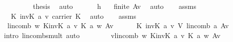 \begin{isabellebody}
\ \ \ \ \isamarkupfalse%
\ {}\ {}\ \isamarkupfalse%
\ {\isacharquery}thesis\ \isamarkupfalse%
\ auto\isanewline
\ \ \isamarkupfalse%
\isanewline
\ \ \isamarkupfalse%
\ h{}\ \isamarkupfalse%
\ {}{}{\isacharcolon}\ {\isachardoublequoteopen}finite\ {\isacharparenleft}A{\isacharminus}{\isacharbraceleft}v{\isacharbraceright}{\isacharparenright}{\isachardoublequoteclose}\ \isamarkupfalse%
\ auto\isanewline
\ \ \isamarkupfalse%
\ assms\ \isamarkupfalse%
\ {}{}\ {\isacharcolon}\ {\isachardoublequoteopen}{\isacharparenleft}{\isasymominus}\isactrlbsub K\isactrlesub \ {\isacharparenleft}inv\isactrlbsub K\isactrlesub \ {\isacharparenleft}a\ v{\isacharparenright}{\isacharparenright}{\isacharparenright}{\isasymin}\ carrier\ K{\isachardoublequoteclose}\ \isamarkupfalse%
\ auto\isanewline
\ \ \isamarkupfalse%
\ assms\ \isamarkupfalse%
\ {}{}{\isacharcolon}\ {\isachardoublequoteopen}lincomb\ {\isacharparenleft}{\isasymlambda}w{\isachardot}\ {\isasymominus}\isactrlbsub K\isactrlesub {\isacharparenleft}inv\isactrlbsub K\isactrlesub \ {\isacharparenleft}a\ v{\isacharparenright}{\isacharparenright}\ {\isasymotimes}\isactrlbsub K\isactrlesub \ a\ w{\isacharparenright}\ {\isacharparenleft}A{\isacharminus}{\isacharbraceleft}v{\isacharbraceright}{\isacharparenright}\ {\isacharequal}\ \isanewline
\ \ \ \ {\isacharparenleft}{\isasymominus}\isactrlbsub K\isactrlesub \ {\isacharparenleft}inv\isactrlbsub K\isactrlesub \ {\isacharparenleft}a\ v{\isacharparenright}{\isacharparenright}{\isacharparenright}\ {\isasymodot}\isactrlbsub V\isactrlesub \ lincomb\ a\ {\isacharparenleft}A{\isacharminus}{\isacharbraceleft}v{\isacharbraceright}{\isacharparenright}{\isachardoublequoteclose}\ \isanewline
\ \ \ \ \isamarkupfalse%
\ {\isacharparenleft}intro\ lincomb{\isacharunderscore}smult{\isacharcomma}\ auto{\isacharparenright}\isanewline
\ \ \isamarkupfalse%
\ {}\ {}{}\ \isamarkupfalse%
\ {}{}{\isacharcolon}\ {\isachardoublequoteopen}v{\isacharequal}lincomb\ {\isacharparenleft}{\isasymlambda}w{\isachardot}\ {\isasymominus}\isactrlbsub K\isactrlesub {\isacharparenleft}inv\isactrlbsub K\isactrlesub \ {\isacharparenleft}a\ v{\isacharparenright}{\isacharparenright}\ {\isasymotimes}\isactrlbsub K\isactrlesub \ a\ w{\isacharparenright}\ {\isacharparenleft}A{\isacharminus}{\isacharbraceleft}v{\isacharbraceright}{\isacharparenright}{\isachardoublequoteclose}\ \isamarkupfalse%

\end{isabellebody}

